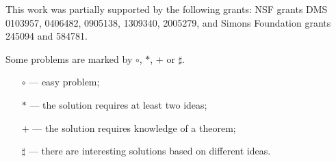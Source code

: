 \documentclass[twoside]{book}
\begin{document}
This work was partially supported by the following grants:
NSF grants DMS 
0103957,
0406482,
0905138,
1309340,
2005279,
and Simons Foundation grants 
245094 and 584781.

\vfill

Some problems are marked by $\circ$, $*$, $+$ or $\sharp$.
\begin{itemize}
\item[$\circ$] --- easy problem;%
\item[$*$] --- the solution requires at least two ideas;%
\item[$+$] --- the solution requires knowledge of a theorem;%
\item[$\sharp$] --- there are interesting solutions based on different ideas.%
\end{itemize}











%
%


\backmatter
\newpage
{}
{\scriptsize

}
\sloppy
\printbibliography[heading=bibintoc]
\fussy
\end{document}
